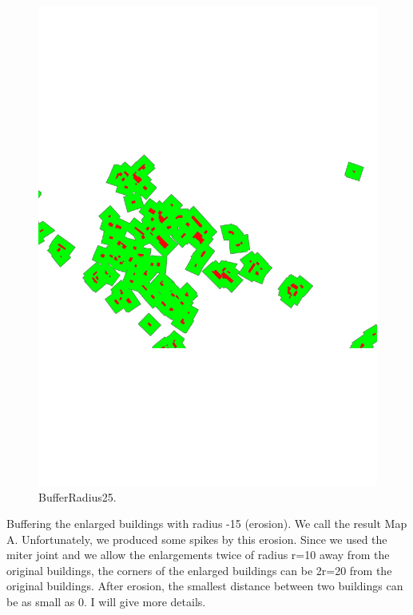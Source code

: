\documentclass[graybox]{svmult}
\begin{document}
\begin{figure}[tb]
	\centering
	\includegraphics[width=\linewidth]{BufferRadius25}
	\caption{BufferRadius25.}
	\label{fig:BufferRadius25}
\end{figure}

Buffering the enlarged buildings with radius -15 (erosion). We 
call the result Map A. Unfortunately, we produced some spikes by 
this erosion. Since we used the miter joint and we allow the 
enlargements twice of radius r=10 away from the original 
buildings, the corners of the enlarged buildings can be 2r=20 
from the original buildings. After erosion, the smallest 
distance between two buildings can be as small as 0. I will give 
more details.
\end{document}
